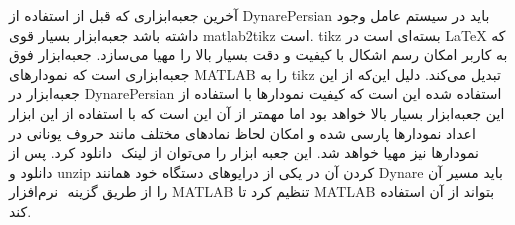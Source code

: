 \documentclass[12pt]{article}
\begin{document}
آخرین جعبه‌ابزاری که قبل از استفاده از DynarePersian باید در سیستم عامل وجود داشته باشد جعبه‌ابزار بسیار قوی matlab2tikz است. tikz بسته‌ای است در ‪\LaTeX‬‬ که به کاربر امکان رسم اشکال با کیفیت و دقت بسیار بالا را مهیا می‌سازد. جعبه‌ابزار فوق جعبه‌ابزاری است که نمودارهای MATLAB را به tikz تبدیل می‌کند. دلیل این‌که از این جعبه‌ابزار در DynarePersian استفاده شده این است که کیفیت نمودارها با استفاده از این جعبه‌ابزار بسیار بالا خواهد بود اما مهمتر از آن این است که با استفاده از این ابزار اعداد نمودارها پارسی شده و امکان لحاظ نمادهای مختلف مانند حروف یونانی در نمودارها نیز مهیا خواهد شد. این جعبه ابزار را می‌توان از لینک ‪‬‬‬‬ دانلود کرد. پس از دانلود و unzip کردن آن در یکی از درایوهای دستگاه خود همانند Dynare باید مسیر آن را از طریق گزینه ‪‬‬‬‬‬ نرم‌افزار MATLAB تنظیم کرد تا MATLAB بتواند از آن استفاده کند. ‪
\end{document}
